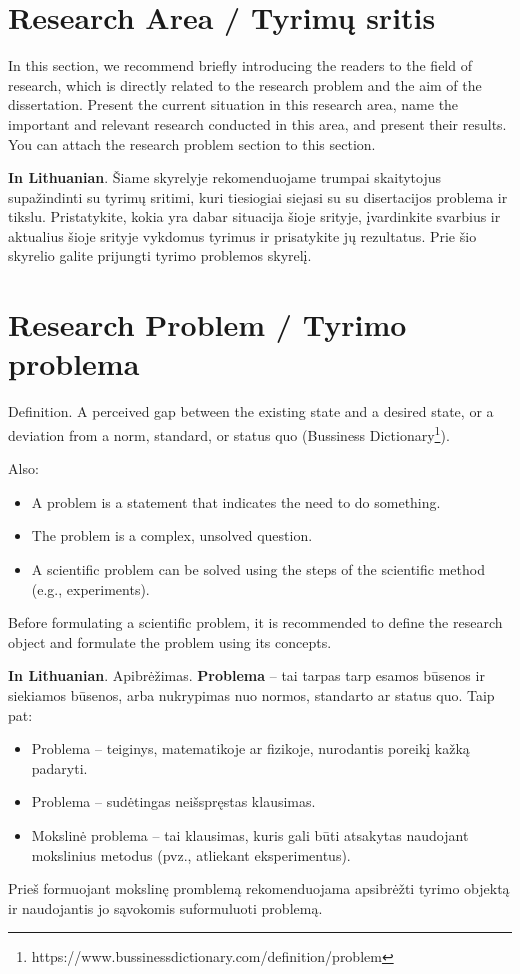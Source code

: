 \section*{Research Area / Tyrimų sritis}

In this section, we recommend briefly introducing the readers to the field of research, which is directly related to the research problem and the aim of the dissertation. Present the current situation in this research area, name the important and relevant research conducted in this area, and present their results. You can attach the research problem section to this section.

\textbf{In Lithuanian}.
Šiame skyrelyje rekomenduojame trumpai skaitytojus supažindinti su tyrimų sritimi, kuri tiesiogiai siejasi su su diser\-tacijos problema ir tikslu. Pristatykite, kokia yra dabar situacija šioje srityje, įvardinkite svarbius ir aktualius šioje srityje vykdomus tyrimus ir prisatykite jų rezultatus. Prie šio skyrelio galite prijungti tyrimo problemos skyrelį.

\section*{Research Problem / Tyrimo problema}

Definition. A perceived gap between the existing state and a desired state, or a deviation from a norm, standard, or status quo (Bussiness Dictionary\footnote{https://www.bussinessdictionary.com/definition/problem}).

Also:
\begin{itemize}
    \item A problem is a statement that indicates the need to do something.
    \item The problem is a complex, unsolved question. 
    \item A scientific problem can be solved using the steps of the scientific method (e.g., experiments).
\end{itemize}
Before formulating a scientific problem, it is recommended to define the research object and formulate the problem using its concepts.


\textbf{In Lithuanian}. Apibrėžimas. \textbf{Problema} – tai tarpas tarp esamos būsenos ir siekiamos būsenos, arba nukrypimas nuo normos, standarto ar status quo.
Taip pat:
\begin{itemize}
    \item Problema – teiginys, matematikoje ar fizikoje, nurodantis poreikį kažką padaryti.
    \item Problema – sudėtingas neišspręstas klausimas. 
    \item Mokslinė problema – tai klausimas, kuris gali būti atsakytas naudojant mokslinius metodus (pvz., atliekant eksperimentus).
\end{itemize}
Prieš formuojant mokslinę promblemą rekomenduojama apsibrėžti tyrimo objektą ir naudojantis jo sąvokomis suformuluoti problemą.


